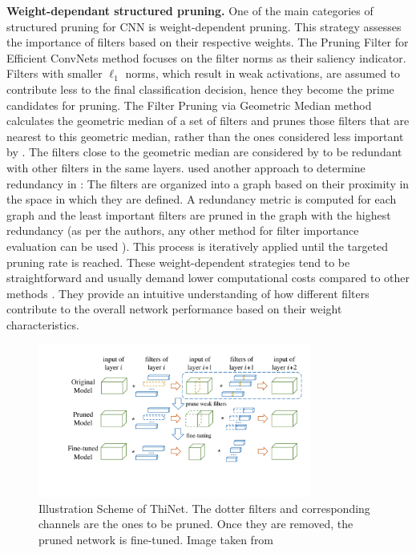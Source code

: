 \noindent\textbf{Weight-dependant structured pruning.} One of the main
categories of structured pruning for \ac{CNN} is weight-dependent pruning. This
strategy assesses the importance of filters based on their respective weights.
The Pruning Filter for Efficient ConvNets method
\cite{DBLP:conf/iclr/0022KDSG17} focuses on the filter norms as their saliency
indicator. Filters with smaller $\ell_1$ norms, which result in weak
activations, are assumed to contribute less to the final classification
decision, hence they become the prime candidates for pruning.  The Filter
Pruning via Geometric Median method \cite{DBLP:conf/cvpr/HeLWHY19} calculates
the geometric median of a set of filters and prunes those filters that are
nearest to this geometric median, rather than the ones considered less important
by \cite{DBLP:conf/iclr/0022KDSG17}. The filters close to the geometric median
are considered by \citeauthor{DBLP:conf/cvpr/HeLWHY19} to be redundant with
other filters in the same layers. \citeauthor{DBLP:conf/cvpr/WangLW21} used
another approach to determine redundancy in \cite{DBLP:conf/cvpr/WangLW21}: The
filters are organized into a graph based on their proximity in the space in
which they are defined. A redundancy metric is computed for each graph and the
least important filters are pruned in the graph with the highest redundancy (as
per the authors, any other method for filter importance evaluation can be used
\cite{DBLP:conf/iclr/0022KDSG17,DBLP:journals/access/PolyakW15,DBLP:conf/iclr/MolchanovTKAK17}).
This process is iteratively applied until the targeted pruning rate is reached.
These weight-dependent strategies tend to be straightforward and usually demand
lower computational costs compared to other methods
\cite{DBLP:journals/corr/abs-2303-00566}. They provide an intuitive
understanding of how different filters contribute to the overall network
performance based on their weight characteristics. \\


\begin{figure}[htbp]
  \centering
  \includegraphics[width=0.8\textwidth]{chapter_sota/assets/thinet.pdf}
  \caption{Illustration Scheme of ThiNet. The dotter filters and corresponding
    channels are the ones to be pruned. Once they are removed, the pruned network
    is fine-tuned. Image taken from \cite{DBLP:conf/iccv/LuoWL17}}
  \label{fig:sota:thinet}
\end{figure}

